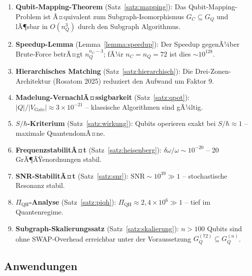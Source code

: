 ﻿\documentclass[a4paper,12pt]{article}
\theoremstyle{definition}
\begin{document}
\begin{enumerate}
\item \textbf{Qubit-Mapping-Theorem} (Satz~\ref{satz:mapping}): Das
  Qubit-Mapping-Problem ist Ã¤quivalent zum Subgraph-Isomorphismus $G_C \subseteq G_Q$
  und lÃ¶sbar in $O(n_Q^3)$ durch den Subgraph Algorithmus.

\item \textbf{Speedup-Lemma} (Lemma~\ref{lemma:speedup}): Der Speedup gegenÃ¼ber
  Brute-Force betrÃ¤gt $n_Q^{n_C-3}$; fÃ¼r $n_C = n_Q = 72$ ist dies $\sim 10^{128}$.

\item \textbf{Hierarchisches Matching} (Satz~\ref{satz:hierarchisch}): Die
  Drei-Zonen-Architektur (Rosatom 2025) reduziert den Aufwand um Faktor 9.

\item \textbf{Madelung-VernachlÃ¤ssigbarkeit} (Satz~\ref{satz:qpot}):
  $|Q|/|V_\mathrm{Gate}| \approx 3\times10^{-21}$ -- klassische Algorithmen sind
  gÃ¼ltig.

\item \textbf{$S/\hbar$-Kriterium} (Satz~\ref{satz:wirkung}): Qubits operieren
  exakt bei $S/\hbar \approx 1$ -- maximale QuantendomÃ¤ne.

\item \textbf{FrequenzstabilitÃ¤t} (Satz~\ref{satz:heisenberg}):
  $\delta\omega/\omega \sim 10^{-20}$ -- 20 GrÃ¶ÃŸenordnungen stabil.

\item \textbf{SNR-StabilitÃ¤t} (Satz~\ref{satz:snr}):
  $\mathrm{SNR} \sim 10^{39} \gg 1$ -- stochastische Resonanz stabil.

\item \textbf{$\Pi_\mathrm{QH}$-Analyse} (Satz~\ref{satz:piqh}):
  $\Pi_\mathrm{QH} \approx 2{,}4\times10^6 \gg 1$ -- tief im Quantenregime.

\item \textbf{Subgraph-Skalierungssatz} (Satz~\ref{satz:skalierung}): $n > 100$
  Qubits sind ohne SWAP-Overhead erreichbar unter der Voraussetzung
  $G_Q^{(72)} \subseteq G_Q^{(n)}$.
\end{enumerate}

\subsection{Anwendungen}
\end{document}
